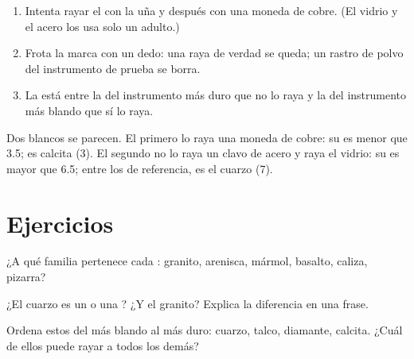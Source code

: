 \begin{method}\label{met:g6:rocks-and-minerals:scratch}
\begin{enumerate}
  \item Intenta rayar el  con la uña y después con una moneda de
        cobre. (El vidrio y el acero los usa solo un adulto.)
  \item Frota la marca con un dedo: una raya de verdad se queda; un rastro
        de polvo del instrumento de prueba se borra.
  \item La  está entre la del instrumento más duro que no lo raya y
        la del instrumento más blando que sí lo raya.
\end{enumerate}
\end{method}

\begin{example}\label{ex:g6:rocks-and-minerals:quartz-calcite}
Dos  blancos se parecen. El primero lo raya una moneda de cobre:
su  es menor que 3.5; es calcita (3). El segundo no lo raya un clavo
de acero y raya el vidrio: su  es mayor que 6.5; entre los 
de referencia, es el cuarzo (7).
\end{example}

\section{Ejercicios}

\begin{exercise}[$\star$]\label{exo:g6:rocks-and-minerals:1}
¿A qué familia pertenece cada : granito, arenisca, mármol, basalto,
caliza, pizarra?
\end{exercise}

\begin{exercise}[$\star$]\label{exo:g6:rocks-and-minerals:2}
¿El cuarzo es un  o una ? ¿Y el granito? Explica la diferencia
en una frase.
\end{exercise}

\begin{exercise}[$\star$]\label{exo:g6:rocks-and-minerals:3}
Ordena estos  del más blando al más duro: cuarzo, talco, diamante,
calcita. ¿Cuál de ellos puede rayar a todos los demás?
\end{exercise}

